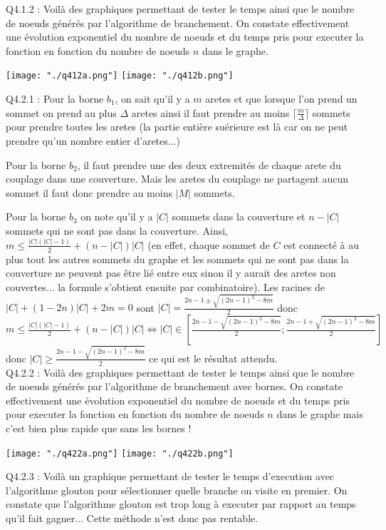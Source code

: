\documentclass[a4paper]{article}
\begin{document}
Q4.1.2 :
Voilà des graphiques permettant de tester le temps ainsi que le nombre de noeuds générés par l'algorithme de branchement. On constate effectivement une évolution exponentiel du nombre de noeuds et du temps pris pour executer la fonction en fonction du nombre de noeuds $n$ dans le graphe.

\texttt{[image: "./q412a.png"]}
\texttt{[image: "./q412b.png"]}

Q4.2.1 : Pour la borne $b_1$, on sait qu'il y a $m$ aretes et que lorsque l'on prend un sommet on prend au plus $\Delta$ aretes ainsi il faut prendre au moins $ \lceil \frac{m}{\Delta} \rceil $ sommets pour prendre toutes les aretes (la partie entière suérieure est là car on ne peut prendre qu'un nombre entier d'aretes...)

Pour la borne $b_2$, il faut prendre une des deux extremités de chaque arete du couplage dans une couverture. Mais les aretes du couplage ne partagent aucun sommet il faut donc prendre au moins $|M|$ sommets.

Pour la borne $b_3$ on note qu'il y a $|C|$ sommets dans la couverture et $n-|C|$ sommets qui ne sont pas dans la couverture. Ainsi,  $m \leq \frac{|C|(|C|-1)}{2} + (n-|C|)|C|$ (en effet, chaque sommet de $C$ est connecté à au plus tout les autres sommets du graphe et les sommets qui ne sont pas dans la couverture ne peuvent pas être lié entre eux sinon il y aurait des aretes non couvertes... la formule s'obtient ensuite par combinatoire). Les racines de $|C| + (1-2n)|C| + 2m = 0$ sont $|C| = \frac{2n - 1 \pm \sqrt{(2n-1)^2 - 8m}}{2}$ donc $m \leq \frac{|C|(|C|-1)}{2} + (n-|C|)|C| \iff |C| \in [\frac{2n - 1 - \sqrt{(2n-1)^2 - 8m}}{2};\frac{2n - 1 + \sqrt{(2n-1)^2 - 8m}}{2}]$ donc $|C| \geq \frac{2n - 1 - \sqrt{(2n-1)^2 - 8m}}{2}$ ce qui est le résultat attendu. \\

Q4.2.2 : 
Voilà des graphiques permettant de tester le temps ainsi que le nombre de noeuds générés par l'algorithme de branchement avec bornes. On constate effectivement une évolution exponentiel du nombre de noeuds et du temps pris pour executer la fonction en fonction du nombre de noeuds $n$ dans le graphe mais c'est bien plus rapide que sans les bornes !

\texttt{[image: "./q422a.png"]}
\texttt{[image: "./q422b.png"]}

Q4.2.3 : 
Voilà un graphique permettant de tester le temps d'execution avec l'algorithme glouton pour sélectionner quelle branche on visite en premier. On constate que l'algorithme glouton est trop long à executer par rapport au temps qu'il fait gagner... Cette méthode n'est donc pas rentable.
\end{document}
